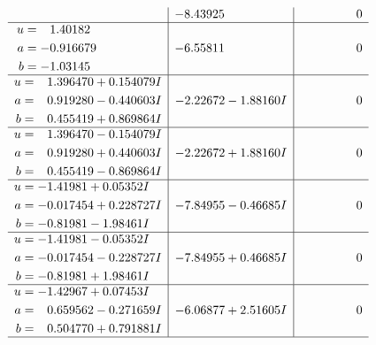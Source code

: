 \documentclass[1p]{elsarticle_modified}
\theoremstyle{definition}
\begin{document}
$$\begin{array}{c|c|c}
 & -8.43925\phantom{ +0.000000I} & \phantom{-0.000000 } 0 \\ \hline\begin{aligned}
u &= \phantom{-}1.40182\phantom{ +0.000000I} \\
a &= -0.916679\phantom{ +0.000000I} \\
b &= -1.03145\phantom{ +0.000000I}\end{aligned}
 & -6.55811\phantom{ +0.000000I} & \phantom{-0.000000 } 0 \\ \hline\begin{aligned}
u &= \phantom{-}1.396470 + 0.154079 I \\
a &= \phantom{-}0.919280 - 0.440603 I \\
b &= \phantom{-}0.455419 + 0.869864 I\end{aligned}
 & -2.22672 - 1.88160 I & \phantom{-0.000000 } 0 \\ \hline\begin{aligned}
u &= \phantom{-}1.396470 - 0.154079 I \\
a &= \phantom{-}0.919280 + 0.440603 I \\
b &= \phantom{-}0.455419 - 0.869864 I\end{aligned}
 & -2.22672 + 1.88160 I & \phantom{-0.000000 } 0 \\ \hline\begin{aligned}
u &= -1.41981 + 0.05352 I \\
a &= -0.017454 + 0.228727 I \\
b &= -0.81981 - 1.98461 I\end{aligned}
 & -7.84955 - 0.46685 I & \phantom{-0.000000 } 0 \\ \hline\begin{aligned}
u &= -1.41981 - 0.05352 I \\
a &= -0.017454 - 0.228727 I \\
b &= -0.81981 + 1.98461 I\end{aligned}
 & -7.84955 + 0.46685 I & \phantom{-0.000000 } 0 \\ \hline\begin{aligned}
u &= -1.42967 + 0.07453 I \\
a &= \phantom{-}0.659562 - 0.271659 I \\
b &= \phantom{-}0.504770 + 0.791881 I\end{aligned}
 & -6.06877 + 2.51605 I & \phantom{-0.000000 } 0\\
 \hline 
 \end{array}$$\newpage$$\begin{array}{c|c|c}  

\end{array}$$
\end{document}
